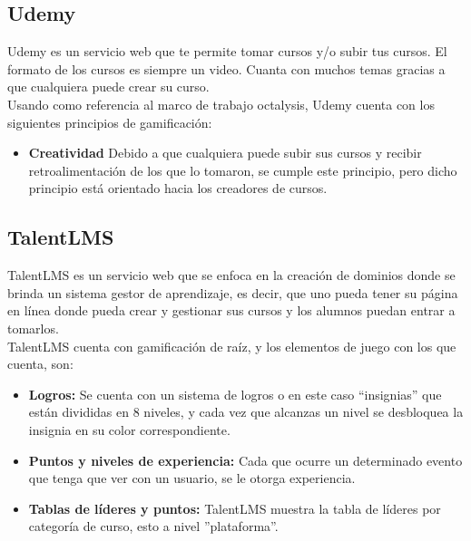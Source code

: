 \begin{multicols*}{2}
\begin{itemize}
    \end{itemize}

\vfill\null
\columnbreak
\subsection*{Udemy}

 Udemy \cite{PagUdemy} es un servicio web que te permite tomar cursos y/o subir tus cursos.
 El formato de los cursos es siempre un video. Cuanta con muchos temas
 gracias a que cualquiera puede crear su curso.\\

    \noindent Usando como referencia al marco de trabajo octalysis,
    Udemy cuenta con los siguientes principios de gamificación:

    \begin{itemize}
        \item {\bf Creatividad} Debido a que cualquiera puede subir
        sus cursos y recibir retroalimentación de los que lo tomaron,
        se cumple este principio, pero dicho principio está orientado
        hacia los creadores de cursos.

    \end{itemize}



\subsection*{TalentLMS}

 TalentLMS \cite{PagTalentLMS} es un servicio web que se enfoca en la creación de dominios donde se
 brinda un sistema gestor de aprendizaje, es decir, que uno pueda tener su página
 en línea donde pueda crear y gestionar sus cursos y los alumnos puedan entrar a tomarlos.\\

    \noindent TalentLMS cuenta con gamificación de raíz,
    y los elementos de juego con los que cuenta, son:

    \begin{itemize}

        \item {\bf Logros:} Se cuenta con un sistema de logros o en este caso
        ``insignias'' que están divididas en 8 niveles, y cada vez que alcanzas
        un nivel se desbloquea la insignia en su color correspondiente.

        \item {\bf Puntos y niveles de experiencia:} Cada que ocurre un
        determinado evento que tenga que ver con un usuario, se le otorga experiencia.

        \item {\bf Tablas de líderes y puntos:} TalentLMS muestra la
        tabla de líderes por categoría de curso, esto a nivel ''plataforma''.

    \end{itemize}

\end{multicols*}




